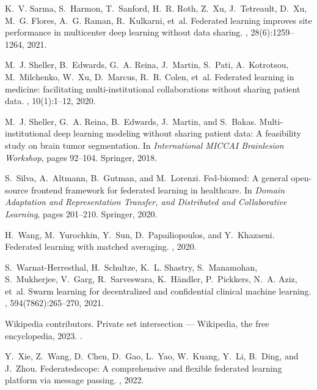 \documentclass[11pt]{article}
\begin{document}
\begin{thebibliography}{10}
K.~V. Sarma, S.~Harmon, T.~Sanford, H.~R. Roth, Z.~Xu, J.~Tetreault, D.~Xu,
  M.~G. Flores, A.~G. Raman, R.~Kulkarni, et~al.
\newblock Federated learning improves site performance in multicenter deep
  learning without data sharing.
,
  28(6):1259--1264, 2021.

M.~J. Sheller, B.~Edwards, G.~A. Reina, J.~Martin, S.~Pati, A.~Kotrotsou,
  M.~Milchenko, W.~Xu, D.~Marcus, R.~R. Colen, et~al.
\newblock Federated learning in medicine: facilitating multi-institutional
  collaborations without sharing patient data.
, 10(1):1--12, 2020.

M.~J. Sheller, G.~A. Reina, B.~Edwards, J.~Martin, and S.~Bakas.
\newblock Multi-institutional deep learning modeling without sharing patient
  data: A feasibility study on brain tumor segmentation.
\newblock In {\em International MICCAI Brainlesion Workshop}, pages 92--104.
  Springer, 2018.

S.~Silva, A.~Altmann, B.~Gutman, and M.~Lorenzi.
\newblock Fed-biomed: A general open-source frontend framework for federated
  learning in healthcare.
\newblock In {\em Domain Adaptation and Representation Transfer, and
  Distributed and Collaborative Learning}, pages 201--210. Springer, 2020.

H.~Wang, M.~Yurochkin, Y.~Sun, D.~Papailiopoulos, and Y.~Khazaeni.
\newblock Federated learning with matched averaging.
, 2020.

S.~Warnat-Herresthal, H.~Schultze, K.~L. Shastry, S.~Manamohan, S.~Mukherjee,
  V.~Garg, R.~Sarveswara, K.~H{\"a}ndler, P.~Pickkers, N.~A. Aziz, et~al.
\newblock Swarm learning for decentralized and confidential clinical machine
  learning.
, 594(7862):265--270, 2021.

{Wikipedia contributors}.
\newblock Private set intersection --- {Wikipedia}{,} the free encyclopedia,
  2023.
.

Y.~Xie, Z.~Wang, D.~Chen, D.~Gao, L.~Yao, W.~Kuang, Y.~Li, B.~Ding, and
  J.~Zhou.
\newblock Federatedscope: A comprehensive and flexible federated learning
  platform via message passing.
, 2022.


\end{thebibliography}
\end{document}
